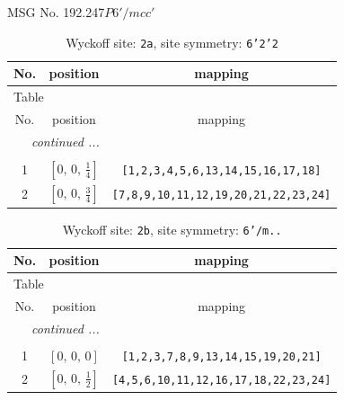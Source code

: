 \documentclass[fleqn,8pt]{jsarticle}
\begin{document}
\setcounter{MaxMatrixCols}{32}

\renewcommand{\tablename}{Table~}
\renewcommand{\figurename}{Figure~}
\begin{center}
\LARGE
MSG No. 192.247\quad$P6'/mcc'$
\end{center}
\renewcommand{\arraystretch}{1.2}
\begin{longtable}{ccc}
\caption{Wyckoff site: {\tt 2a}, site symmetry: {\tt 6'2'2}}
 \\
 \hline \hline
No. & position & mapping \\ \hline \endfirsthead

\multicolumn{2}{l}{\tablename\ \thetable{}} \\
 \hline \hline
No. & position & mapping \\ \hline \endhead

 \hline \hline
\multicolumn{2}{r}{\footnotesize\it continued ...} \\ \endfoot

 \hline \hline
\multicolumn{2}{r}{} \\ \endlastfoot

1 & $\left[ 0,\, 0,\, \frac{1}{4} \right]$ & {\tt [1,2,3,4,5,6,13,14,15,16,17,18]} \\ \hline
2 & $\left[ 0,\, 0,\, \frac{3}{4} \right]$ & {\tt [7,8,9,10,11,12,19,20,21,22,23,24]} \\
\end{longtable}
\renewcommand{\arraystretch}{1.2}
\begin{longtable}{ccc}
\caption{Wyckoff site: {\tt 2b}, site symmetry: {\tt 6'/m..}}
 \\
 \hline \hline
No. & position & mapping \\ \hline \endfirsthead

\multicolumn{2}{l}{\tablename\ \thetable{}} \\
 \hline \hline
No. & position & mapping \\ \hline \endhead

 \hline \hline
\multicolumn{2}{r}{\footnotesize\it continued ...} \\ \endfoot

 \hline \hline
\multicolumn{2}{r}{} \\ \endlastfoot

1 & $\left[ 0,\, 0,\, 0 \right]$ & {\tt [1,2,3,7,8,9,13,14,15,19,20,21]} \\ \hline
2 & $\left[ 0,\, 0,\, \frac{1}{2} \right]$ & {\tt [4,5,6,10,11,12,16,17,18,22,23,24]} \\
\end{longtable}
\end{document}

